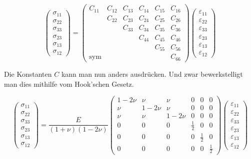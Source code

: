 \[
\begin{pmatrix}
	\sigma_{11} \\
	\sigma_{22} \\
	\sigma_{33} \\
	\sigma_{23} \\
	\sigma_{13} \\
	\sigma_{12}
\end{pmatrix}
=
\begin{pmatrix}
	  C_{11} & C_{12} & C_{13} & C_{14} & C_{15} & C_{16} \\
	         & C_{22} & C_{23} & C_{24} & C_{25} & C_{26} \\
	         &        & C_{33} & C_{34} & C_{35} & C_{36} \\ 
	         &        &        & C_{44} & C_{45} & C_{46} \\ 
             &        &        &        & C_{55} & C_{56} \\
  \text{sym} &        &        &        &        & C_{66} 
\end{pmatrix}
\begin{pmatrix}
	\varepsilon_{11} \\
	\varepsilon_{22} \\
	\varepsilon_{33} \\
	\varepsilon_{23} \\
	\varepsilon_{13} \\
	\varepsilon_{12}
\end{pmatrix}
\]

Die Konstanten $C$ kann man nun anders ausdrücken.
Und zwar bewerkstelligt man dies mithilfe vom Hook'schen Gesetz.

\[
\begin{pmatrix}
	\sigma_{11}\\
	\sigma_{22}\\
	\sigma_{33}\\
	\sigma_{23}\\
	\sigma_{13}\\
	\sigma_{12}
\end{pmatrix}
=
\frac{E}{(1+\nu)(1-2\nu)}
\begin{pmatrix}
	1- 2\nu & \nu     & \nu     & 0           & 0           & 0\\
	    \nu & 1- 2\nu & \nu     & 0           & 0           & 0\\
        \nu & \nu     & 1- 2\nu & 0           & 0           & 0\\
          0 & 0       & 0       & \frac{1}{2} & 0           & 0\\
          0 & 0       & 0       & 0           & \frac{1}{2} & 0\\
          0 & 0       & 0       & 0           & 0           & \frac{1}{2}
\end{pmatrix}
\begin{pmatrix}
	\varepsilon_{11}\\
	\varepsilon_{22}\\
	\varepsilon_{33}\\
	\varepsilon_{23}\\
	\varepsilon_{13}\\
	\varepsilon_{12}
\end{pmatrix}
\]

